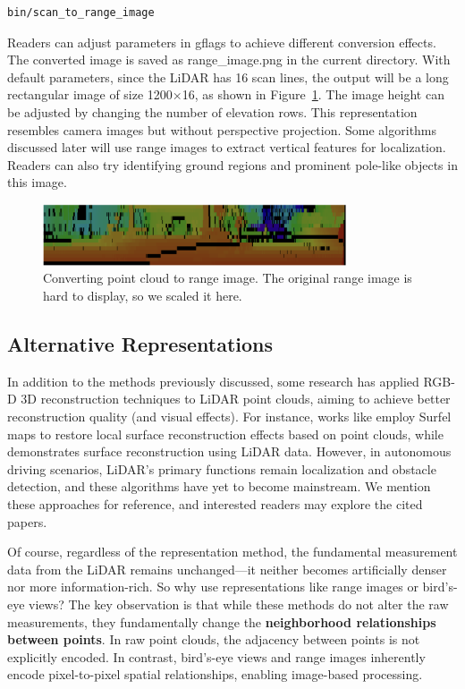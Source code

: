 \begin{lstlisting}[language=sh,caption=Terminal input:]
bin/scan_to_range_image 
\end{lstlisting}

Readers can adjust parameters in gflags to achieve different conversion effects. The converted image is saved as range_image.png in the current directory. With default parameters, since the LiDAR has 16 scan lines, the output will be a long rectangular image of size 1200×16, as shown in Figure~\ref{fig:range-image-example}. The image height can be adjusted by changing the number of elevation rows. This representation resembles camera images but without perspective projection. Some algorithms discussed later will use range images to extract vertical features for localization. Readers can also try identifying ground regions and prominent pole-like objects in this image.

\begin{figure}[!htp]
	\centering
	\includegraphics[width=0.8\textwidth]{resources/basic-point-cloud/range-image-raw.png}
	\caption{Converting point cloud to range image. The original range image is hard to display, so we scaled it here.}
	\label{fig:range-image-example}
\end{figure}

\subsection{Alternative Representations}
In addition to the methods previously discussed, some research has applied RGB-D 3D reconstruction techniques to LiDAR point clouds, aiming to achieve better reconstruction quality (and visual effects). For instance, works like \cite{Park2017, Park2018} employ Surfel maps to restore local surface reconstruction effects based on point clouds, while \cite{Roldao2019} demonstrates surface reconstruction using LiDAR data. However, in autonomous driving scenarios, LiDAR's primary functions remain localization and obstacle detection, and these algorithms have yet to become mainstream. We mention these approaches for reference, and interested readers may explore the cited papers.  

Of course, regardless of the representation method, the fundamental measurement data from the LiDAR remains unchanged—it neither becomes artificially denser nor more information-rich. So why use representations like range images or bird's-eye views? The key observation is that while these methods do not alter the raw measurements, they fundamentally change the \textbf{neighborhood relationships between points}. In raw point clouds, the adjacency between points is not explicitly encoded. In contrast, bird's-eye views and range images inherently encode pixel-to-pixel spatial relationships, enabling image-based processing.  

